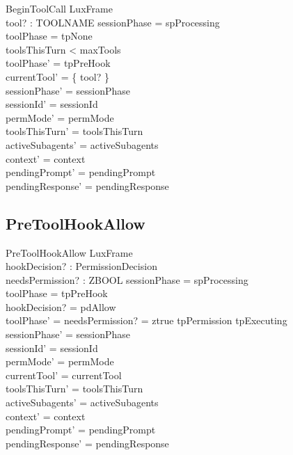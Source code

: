 \documentclass[a4paper,10pt,fleqn]{article}
\begin{document}
\begin{schema}{BeginToolCall}
  LuxFrame \\
  tool? : TOOLNAME
  \where
  sessionPhase = spProcessing \\
  toolPhase = tpNone \\
  toolsThisTurn < maxTools \\
  toolPhase' = tpPreHook \\
  currentTool' = \{ tool? \} \\
  sessionPhase' = sessionPhase \\
  sessionId' = sessionId \\
  permMode' = permMode \\
  toolsThisTurn' = toolsThisTurn \\
  activeSubagents' = activeSubagents \\
  context' = context \\
  pendingPrompt' = pendingPrompt \\
  pendingResponse' = pendingResponse
\end{schema}

\subsection{PreToolHookAllow}

\begin{schema}{PreToolHookAllow}
  LuxFrame \\
  hookDecision? : PermissionDecision \\
  needsPermission? : ZBOOL
  \where
  sessionPhase = spProcessing \\
  toolPhase = tpPreHook \\
  hookDecision? = pdAllow \\
  toolPhase' = \IF needsPermission? = ztrue \THEN tpPermission \ELSE tpExecuting \\
  sessionPhase' = sessionPhase \\
  sessionId' = sessionId \\
  permMode' = permMode \\
  currentTool' = currentTool \\
  toolsThisTurn' = toolsThisTurn \\
  activeSubagents' = activeSubagents \\
  context' = context \\
  pendingPrompt' = pendingPrompt \\
  pendingResponse' = pendingResponse
\end{schema}
\end{document}
